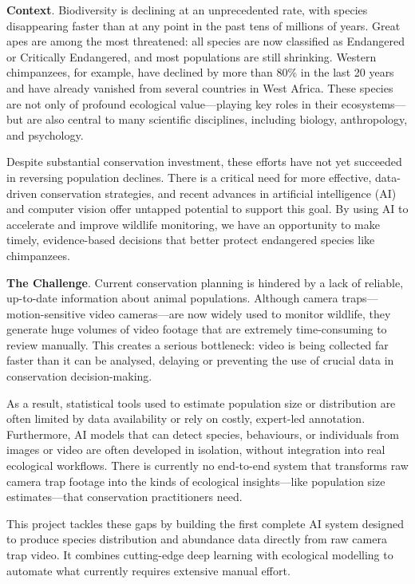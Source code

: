 \textbf{Context}. Biodiversity is declining at an unprecedented rate, with species disappearing faster than at any point in the past tens of millions of years. Great apes are among the most threatened: all species are now classified as Endangered or Critically Endangered, and most populations are still shrinking. Western chimpanzees, for example, have declined by more than 80\% in the last 20 years and have already vanished from several countries in West Africa. These species are not only of profound ecological value—playing key roles in their ecosystems—but are also central to many scientific disciplines, including biology, anthropology, and psychology.

Despite substantial conservation investment, these efforts have not yet succeeded in reversing population declines. There is a critical need for more effective, data-driven conservation strategies, and recent advances in artificial intelligence (AI) and computer vision offer untapped potential to support this goal. By using AI to accelerate and improve wildlife monitoring, we have an opportunity to make timely, evidence-based decisions that better protect endangered species like chimpanzees.

\textbf{The Challenge}. Current conservation planning is hindered by a lack of reliable, up-to-date information about animal populations. Although camera traps—motion-sensitive video cameras—are now widely used to monitor wildlife, they generate huge volumes of video footage that are extremely time-consuming to review manually. This creates a serious bottleneck: video is being collected far faster than it can be analysed, delaying or preventing the use of crucial data in conservation decision-making.

As a result, statistical tools used to estimate population size or distribution are often limited by data availability or rely on costly, expert-led annotation. Furthermore, AI models that can detect species, behaviours, or individuals from images or video are often developed in isolation, without integration into real ecological workflows. There is currently no end-to-end system that transforms raw camera trap footage into the kinds of ecological insights—like population size estimates—that conservation practitioners need.

This project tackles these gaps by building the first complete AI system designed to produce species distribution and abundance data directly from raw camera trap video. It combines cutting-edge deep learning with ecological modelling to automate what currently requires extensive manual effort.

